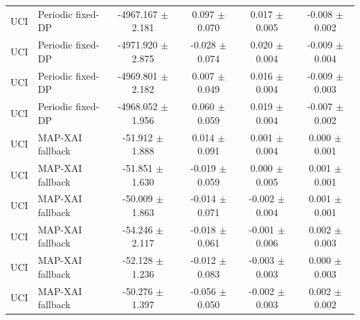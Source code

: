 \begin{tabular}{llcccc}
UCI & Periodic fixed-DP & -4967.167 $\pm$ 2.181 & 0.097 $\pm$ 0.070 & 0.017 $\pm$ 0.005 & -0.008 $\pm$ 0.002 \\
UCI & Periodic fixed-DP & -4971.920 $\pm$ 2.875 & -0.028 $\pm$ 0.074 & 0.020 $\pm$ 0.004 & -0.009 $\pm$ 0.004 \\
UCI & Periodic fixed-DP & -4969.801 $\pm$ 2.182 & 0.007 $\pm$ 0.049 & 0.016 $\pm$ 0.004 & -0.009 $\pm$ 0.003 \\
UCI & Periodic fixed-DP & -4968.052 $\pm$ 1.956 & 0.060 $\pm$ 0.059 & 0.019 $\pm$ 0.004 & -0.007 $\pm$ 0.002 \\
UCI & MAP-XAI fallback & -51.912 $\pm$ 1.888 & 0.014 $\pm$ 0.091 & 0.001 $\pm$ 0.004 & 0.000 $\pm$ 0.001 \\
UCI & MAP-XAI fallback & -51.851 $\pm$ 1.630 & -0.019 $\pm$ 0.059 & 0.000 $\pm$ 0.005 & 0.001 $\pm$ 0.001 \\
UCI & MAP-XAI fallback & -50.009 $\pm$ 1.863 & -0.014 $\pm$ 0.071 & -0.002 $\pm$ 0.004 & 0.001 $\pm$ 0.001 \\
UCI & MAP-XAI fallback & -54.246 $\pm$ 2.117 & -0.018 $\pm$ 0.061 & -0.001 $\pm$ 0.006 & 0.002 $\pm$ 0.003 \\
UCI & MAP-XAI fallback & -52.128 $\pm$ 1.236 & -0.012 $\pm$ 0.083 & -0.003 $\pm$ 0.003 & 0.000 $\pm$ 0.003 \\
UCI & MAP-XAI fallback & -50.276 $\pm$ 1.397 & -0.056 $\pm$ 0.050 & -0.002 $\pm$ 0.003 & 0.002 $\pm$ 0.002 \\
\bottomrule
\end{tabular}
